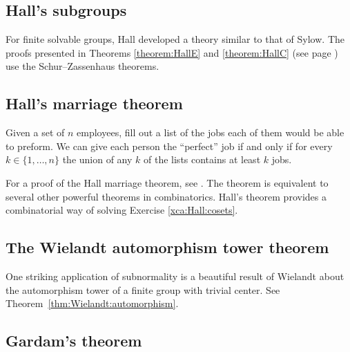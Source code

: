 
\subsection*{Hall's subgroups}

For finite solvable groups, Hall developed a theory similar to that of Sylow. The proofs
presented in Theorems \ref{theorem:HallE} and \ref{theorem:HallC} (see page \pageref{theorem:HallC}) use
the Schur--Zassenhaus theorems. 


\subsection*{Hall's marriage theorem}

Given a set of $n$ employees, fill out a list of the jobs each of them
would be able to preform. We can give each person the ``perfect'' job
if and only if for every $k\in\{1,\dots,n\}$ 
the union of any $k$ of the lists contains at least $k$ jobs. 

For a proof of the Hall marriage theorem, see \cite{MR33330}. 
The theorem is equivalent to several other
powerful theorems in combinatorics. Hall's theorem 
provides a combinatorial way of solving 
Exercise \ref{xca:Hall:cosets}. 


\subsection*{The Wielandt automorphism tower theorem}

One striking application of subnormality is a beautiful result 
of Wielandt about the automorphism tower of a finite group 
with trivial center. See 
Theorem~\ref{thm:Wielandt:automorphism}.

\subsection*{Gardam's theorem}

